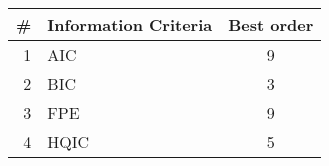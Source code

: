 \begin{tabular}{rlc}
\toprule
\# &  Information Criteria &   Best order \\
\midrule
1 & AIC  &  9 \\
2 & BIC  &  3\\
3 & FPE  &  9\\
4 & HQIC &  5\\
\bottomrule
\end{tabular}
